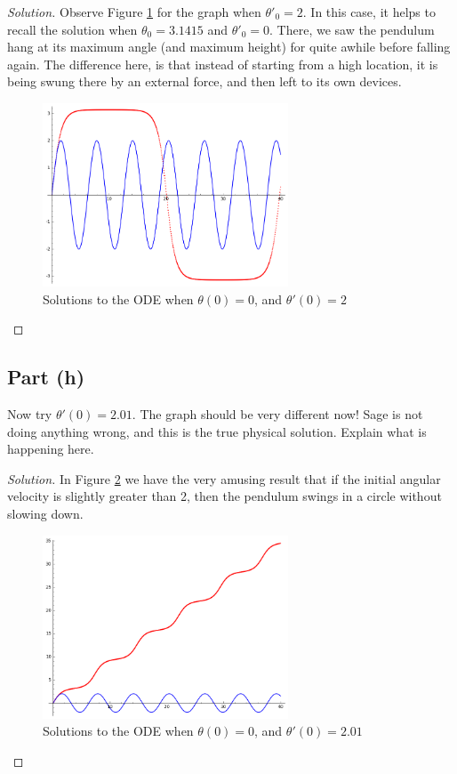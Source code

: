 \documentclass[letterpaper, 12pt]{amsart}
\theoremstyle{definition}  							%
\begin{document}
		\begin{proof}[Solution]
		Observe Figure \ref{fastTheta2} for the graph when $\theta'_{0} = 2$.
		In this case, it helps to recall the solution when $\theta_{0}=3.1415$ and $\theta'_{0} = 0$.
		There, we saw the pendulum hang at its maximum angle (and maximum height) for quite awhile before falling again.
		The difference here, is that instead of starting from a high location, it is being swung there by an external force, and then left to its own devices.

		\begin{figure}[b]
			\includegraphics[width=0.65\textwidth]{images/fastTheta2.png}
			\caption{Solutions to the ODE when $\theta(0)=0$, and $\theta'(0)=2$}
			\label{fastTheta2}
		\end{figure}
		\end{proof}

		\subsection*{Part (h)}
		Now try $\theta'(0) = 2.01$. 
		The graph should be very different now! 
		Sage is not doing anything wrong, and this is the true physical solution. 
		Explain what is happening here.

		\begin{proof}[Solution]
		In Figure \ref{fastTheta3} we have the very amusing result that if the initial angular velocity is slightly greater than 2, then the pendulum swings in a circle without slowing down.

		\begin{figure}[b]
			\includegraphics[width=0.65\textwidth]{images/fastTheta3.png}
			\caption{Solutions to the ODE when $\theta(0)=0$, and $\theta'(0)=2.01$}
			\label{fastTheta3}
		\end{figure}
		\end{proof}
\end{document}

